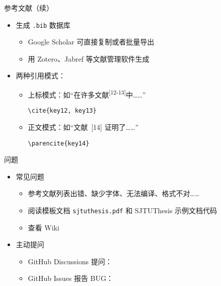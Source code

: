 \begin{frame}[fragile]{参考文献（续）}
  \begin{itemize}
    \item 生成 \verb|.bib| 数据库
          \begin{itemize}
            \item Google Scholar 可直接复制或者批量导出
            \item 用 Zotero、Jabref 等文献管理软件生成
          \end{itemize}
    \item 两种引用模式：
          \begin{itemize}
            \item 上标模式：如“在许多文献\textsuperscript{[12-13]}中……”
                  \begin{lstlisting}[basicstyle=\ttfamily]
    \cite{key12, key13}
          \end{lstlisting}
            \item 正文模式：如“文献~[14] 证明了……”
                  \begin{lstlisting}[basicstyle=\ttfamily]
    \parencite{key14}
          \end{lstlisting}
          \end{itemize}
  \end{itemize}
\end{frame}

\begin{frame}[fragile]{\SJTUThesis 问题}
  \begin{itemize}
    \item 常见问题
          \begin{itemize}
            \item 参考文献列表出错、缺少字体、无法编译、格式不对……
            \item 阅读模板文档 \verb|sjtuthesis.pdf| 和 SJTUThesis 示例文档代码
            \item 查看 Wiki 
          \end{itemize}

    \item 主动提问
          \begin{itemize}
            \item GitHub Discussions 提问：
            \item GitHub Issues 报告 BUG：
          \end{itemize}

  \end{itemize}
\end{frame}
